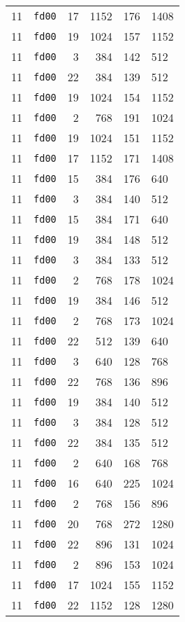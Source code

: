 \documentclass{article}
\begin{document}
\begin{table}[h!]
\begin{tabular}{llrrrl}
    11 & \texttt{fd00} & 17 & 1152 & 176 & 1408 \\
    11 & \texttt{fd00} & 19 & 1024 & 157 & 1152 \\
    11 & \texttt{fd00} & 3 & 384 & 142 & 512 \\
    11 & \texttt{fd00} & 22 & 384 & 139 & 512 \\
    11 & \texttt{fd00} & 19 & 1024 & 154 & 1152 \\
    11 & \texttt{fd00} & 2 & 768 & 191 & 1024 \\
    11 & \texttt{fd00} & 19 & 1024 & 151 & 1152 \\
    11 & \texttt{fd00} & 17 & 1152 & 171 & 1408 \\
    11 & \texttt{fd00} & 15 & 384 & 176 & 640 \\
    11 & \texttt{fd00} & 3 & 384 & 140 & 512 \\
    11 & \texttt{fd00} & 15 & 384 & 171 & 640 \\
    11 & \texttt{fd00} & 19 & 384 & 148 & 512 \\
    11 & \texttt{fd00} & 3 & 384 & 133 & 512 \\
    11 & \texttt{fd00} & 2 & 768 & 178 & 1024 \\
    11 & \texttt{fd00} & 19 & 384 & 146 & 512 \\
    11 & \texttt{fd00} & 2 & 768 & 173 & 1024 \\
    11 & \texttt{fd00} & 22 & 512 & 139 & 640 \\
    11 & \texttt{fd00} & 3 & 640 & 128 & 768 \\
    11 & \texttt{fd00} & 22 & 768 & 136 & 896 \\
    11 & \texttt{fd00} & 19 & 384 & 140 & 512 \\
    11 & \texttt{fd00} & 3 & 384 & 128 & 512 \\
    11 & \texttt{fd00} & 22 & 384 & 135 & 512 \\
    11 & \texttt{fd00} & 2 & 640 & 168 & 768 \\
    11 & \texttt{fd00} & 16 & 640 & 225 & 1024 \\
    11 & \texttt{fd00} & 2 & 768 & 156 & 896 \\
    11 & \texttt{fd00} & 20 & 768 & 272 & 1280 \\
    11 & \texttt{fd00} & 22 & 896 & 131 & 1024 \\
    11 & \texttt{fd00} & 2 & 896 & 153 & 1024 \\
    11 & \texttt{fd00} & 17 & 1024 & 155 & 1152 \\
    11 & \texttt{fd00} & 22 & 1152 & 128 & 1280 \\

\end{tabular}
\end{table}
\end{document}
